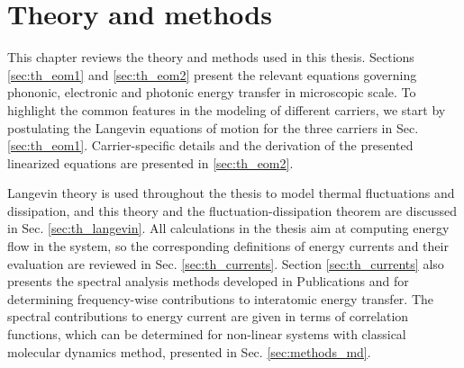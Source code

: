 \chapter{Theory and methods}
\label{chap:theory}

This chapter reviews the theory and methods used in this thesis. Sections \ref{sec:th_eom1} and \ref{sec:th_eom2} present the relevant equations governing phononic, electronic and photonic energy transfer in microscopic scale. To highlight the common features in the modeling of different carriers, we start by postulating the Langevin equations of motion for the three carriers in Sec. \ref{sec:th_eom1}. Carrier-specific details and the derivation of the presented linearized equations are presented in \ref{sec:th_eom2}. 

Langevin theory is used throughout the thesis to model thermal fluctuations and dissipation, and this theory and the fluctuation-dissipation theorem are discussed in Sec. \ref{sec:th_langevin}. All calculations in the thesis aim at computing energy flow in the system, so the corresponding definitions of energy currents and their evaluation are reviewed in Sec. \ref{sec:th_currents}. Section \ref{sec:th_currents} also presents the spectral analysis methods developed in Publications  and  for determining frequency-wise contributions to interatomic energy transfer. The spectral contributions to energy current are given in terms of correlation functions, which can be determined for non-linear systems with classical molecular dynamics method, presented in Sec. \ref{sec:methods_md}.




